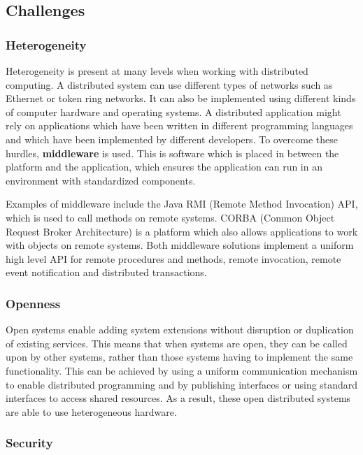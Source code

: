 \documentclass[a4paper]{article}
\begin{document}
\subsection{Challenges}

\subsubsection{Heterogeneity}

Heterogeneity is present at many levels when working with distributed computing. A distributed system can use different types of networks such as Ethernet or token ring networks. It can also be implemented using different kinds of computer hardware and operating systems. A distributed application might rely on applications which have been written in different programming languages and which have been implemented by different developers. To overcome these hurdles, \textbf{middleware} is used. This is software which is placed in between the platform and the application, which ensures the application can run in an environment with standardized components.

Examples of middleware include the Java RMI (Remote Method Invocation) API, which is used to call methods on remote systems. CORBA (Common Object Request Broker Architecture) is a platform which also allows applications to work with objects on remote systems. Both middleware solutions implement a uniform high level API for remote procedures and methods, remote invocation, remote event notification and distributed transactions.

\subsubsection{Openness}

Open systems enable adding system extensions without disruption or duplication of existing services. This means that when systems are open, they can be called upon by other systems, rather than those systems having to implement the same functionality. This can be achieved by using a uniform communication mechanism to enable distributed programming and by publishing interfaces or using standard interfaces to access shared resources. As a result, these open distributed systems are able to use heterogeneous hardware.

\subsubsection{Security}
\end{document}
